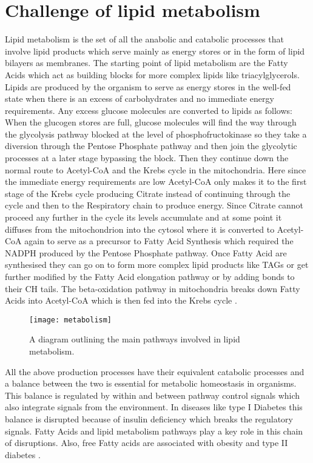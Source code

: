 \section{Challenge of lipid metabolism}
Lipid metabolism is the set of all the anabolic and catabolic
processes that involve lipid products which serve mainly as energy
stores or in the form of lipid bilayers as membranes. The starting
point of lipid metabolism are the Fatty Acids which act as building
blocks for more complex lipids like triacylglycerols. Lipids are
produced by the organism to serve as energy stores in the well-fed state when there is an excess
of carbohydrates and no immediate energy requirements. Any excess
glucose molecules are converted to lipids as follows: When the
glucogen stores are full, glucose molecules will find the way through
the glycolysis pathway blocked at the level of phosphofructokinase so
they take a diversion through the Pentose Phosphate pathway and then
join the glycolytic processes at a later stage bypassing the
block. Then they continue down the normal route to Acetyl-CoA and the
Krebs cycle in the mitochondria. Here since the immediate energy requirements
are low Acetyl-CoA only makes it to the first stage of the Krebs cycle
producing Citrate instead of continuing through the cycle and then to
the Respiratory chain to produce energy. Since Citrate cannot proceed any further in the
cycle its levels accumulate and at some point it diffuses from
the mitochondrion into the cytosol where it is converted to Acetyl-CoA
again to serve as a precursor to Fatty Acid Synthesis which required
the NADPH produced by the Pentose Phosphate pathway. Once Fatty Acid
are synthesised they can go on to form more complex lipid products like
TAGs or get further modified by the Fatty Acid elongation pathway or
by adding bonds to their CH tails. The beta-oxidation pathway in
mitochondria breaks down Fatty Acids into Acetyl-CoA which is then fed
into the Krebs cycle \cite [] {salway2013metabolism}.

\begin{figure}[htbp!]
\centering
\texttt{[image: metabolism]}
\caption[Lipid metabolism and interacting pathways]{A diagram
  outlining the main pathways involved in lipid metabolism.}
\label{fig:lipid_metabolism}
\end{figure}

All the above production processes have their equivalent catabolic
processes and a balance between the two is essential for metabolic
homeostasis in organisms. This balance is regulated by within and
between pathway control signals which also integrate signals from the
environment. In diseases like type I Diabetes this balance is
disrupted because of insulin deficiency which breaks the regulatory
signals. Fatty Acids and lipid metabolism pathways play a key role
in this chain of disruptions. Also, free Fatty acids are
associated with obesity and type II diabetes \cite [] {boden2002free}.

